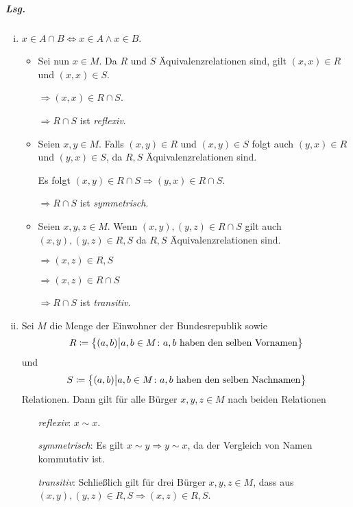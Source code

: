 \documentclass{scrreprt}
\begin{document}
\newpage
\subparagraph{Lsg.}
\begin{enumerate}[(i)]
\item $x \in A \cap B \iff x \in A \land x \in B$.

  \begin{itemize}
  \item Sei nun $x \in M$.
    Da $R$ und $S$ Äquivalenzrelationen sind, gilt $(x, x) \in R$ und
    $(x, x) \in S$.

    $\Rightarrow (x, x) \in R \cap S$.

    $\Rightarrow R \cap S$ ist \emph{reflexiv}.

  \item Seien $x, y \in M$.
    Falls $(x, y) \in R$ und $(x, y) \in S$ folgt auch $(y, x) \in R$ und
    $(y, x) \in S$, da $R, S$ Äquivalenzrelationen sind.

    Es folgt $(x, y) \in R \cap S \Rightarrow (y, x) \in R \cap S$.

    $\Rightarrow R \cap S$ ist \emph{symmetrisch}.

  \item Seien $x, y, z \in M$.
    Wenn $(x, y), (y, z) \in R \cap S$ gilt auch $(x, y), (y, z) \in R, S$ da
    $R, S$ Äquivalenzrelationen sind.

    $\Rightarrow (x, z) \in R, S$

    $\Rightarrow (x, z) \in R \cap S$

    $\Rightarrow R \cap S$ ist \emph{transitiv}.
  \end{itemize}

\item  Sei $M$ die Menge der Einwohner der Bundesrepublik sowie
  \[
    R \coloneqq \qty\big{(a, b) {\big |} a, b \in M \colon
      a, b \text{ haben den selben Vornamen}}
  \]
  und
  \[
    S \coloneqq \qty\big{(a, b) {\big |} a, b \in M \colon
    a, b \text{ haben den selben Nachnamen}}
  \]
  Relationen.
  Dann gilt für alle Bürger $x, y, z \in M$ nach beiden Relationen
  \begin{itemize}
  \item[\emph{reflexiv}:] $x \sim x$.
  \item[\emph{symmetrisch}:] Es gilt $x \sim y \Rightarrow y \sim x$,
    da der Vergleich von Namen kommutativ ist.

  \item[\emph{transitiv}:] Schließlich gilt für drei Bürger $x, y, z \in M$, dass aus
    $(x, y), (y, z) \in R,  S \Rightarrow (x, z) \in R, S$.
  \end{itemize}


\end{enumerate}
\end{document}
